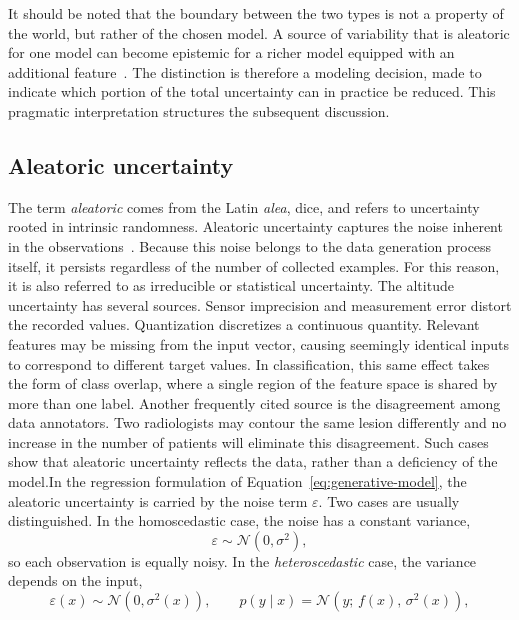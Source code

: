 It should be noted that the boundary between the two types is not a property of the world, but rather of the chosen model. A source of variability that is aleatoric for one model can become epistemic for a richer model equipped with an additional feature~\cite{derkiureghian2009}. The distinction is therefore a modeling decision, made to indicate which portion of the total uncertainty can in practice be reduced. This pragmatic interpretation structures the subsequent discussion.

\subsection{Aleatoric uncertainty}
\label{subsec:aleatoric}

The term \emph{aleatoric} comes from the Latin \emph{alea}, dice, and refers to uncertainty rooted in intrinsic randomness. Aleatoric uncertainty captures the noise inherent in the observations~\cite{kendall2017}. Because this noise belongs to the data generation process itself, it persists regardless of the number of collected examples. For this reason, it is also referred to as irreducible or statistical uncertainty. The altitude uncertainty has several sources. Sensor imprecision and measurement error distort the recorded values. Quantization discretizes a continuous quantity. Relevant features may be missing from the input vector, causing seemingly identical inputs to correspond to different target values. In classification, this same effect takes the form of class overlap, where a single region of the feature space is shared by more than one label. Another frequently cited source is the disagreement among data annotators. Two radiologists may contour the same lesion differently and no increase in the number of patients will eliminate this disagreement. Such cases show that aleatoric uncertainty reflects the data, rather than a deficiency of the model.In the regression formulation of Equation~\eqref{eq:generative-model}, the aleatoric uncertainty is carried by the noise term $\varepsilon$. Two cases are usually distinguished. In the homoscedastic case, the noise has a constant variance,
%
\begin{equation}
    \varepsilon \sim \mathcal{N}\!\left(0, \sigma^2\right),
    \label{eq:homoscedastic}
\end{equation}
%
so each observation is equally noisy. In the \emph{heteroscedastic} case, the variance depends on the input,
%
\begin{equation}
    \varepsilon(x) \sim \mathcal{N}\!\left(0, \sigma^2(x)\right),
    \qquad
    p(y \mid x) = \mathcal{N}\!\left(y;\, f(x),\, \sigma^2(x)\right),
    \label{eq:heteroscedastic}
\end{equation}
